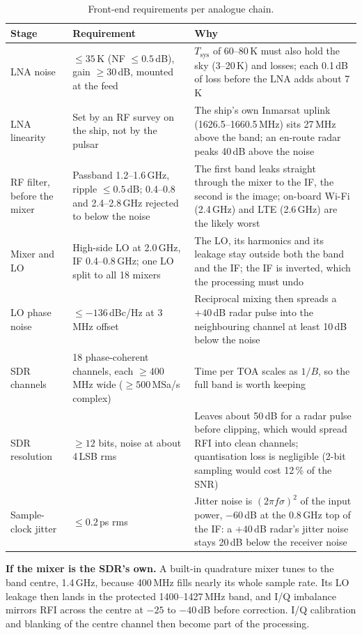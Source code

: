 \documentclass[11pt,a4paper]{article}
\begin{document}
\begin{table}[ht]
\centering
\small
\renewcommand{\arraystretch}{1.15}
\begin{tabularx}{\linewidth}{@{}p{2.6cm}XX@{}}
\toprule
Stage & Requirement & Why \\
\midrule
LNA noise & $\le 35$\,K (NF $\le 0.5$\,dB), gain $\ge 30$\,dB, mounted at the feed &
  $T_\mathrm{sys}$ of 60--80\,K must also hold the sky (3--20\,K) and losses; each 0.1\,dB of loss
  before the LNA adds about 7\,K \\
LNA linearity & Set by an RF survey on the ship, not by the pulsar &
  The ship's own Inmarsat uplink (1626.5--1660.5\,MHz) sits 27\,MHz above the band; an en-route radar
  peaks 40\,dB above the noise \\
RF filter, before the mixer & Passband 1.2--1.6\,GHz, ripple $\le 0.5$\,dB; 0.4--0.8 and 2.4--2.8\,GHz
  rejected to below the noise &
  The first band leaks straight through the mixer to the IF, the second is the image; on-board Wi-Fi
  (2.4\,GHz) and LTE (2.6\,GHz) are the likely worst \\
Mixer and LO & High-side LO at 2.0\,GHz, IF 0.4--0.8\,GHz; one LO split to all 18 mixers &
  The LO, its harmonics and its leakage stay outside both the band and the IF; the IF is inverted,
  which the processing must undo \\
LO phase noise & $\le -136$\,dBc/Hz at 3\,MHz offset &
  Reciprocal mixing then spreads a $+40$\,dB radar pulse into the neighbouring channel at least 10\,dB
  below the noise \\
SDR channels & 18 phase-coherent channels, each $\ge 400$\,MHz wide ($\ge 500$\,MSa/s complex) &
  Time per TOA scales as $1/B$, so the full band is worth keeping \\
SDR resolution & $\ge 12$ bits, noise at about 4\,LSB rms &
  Leaves about 50\,dB for a radar pulse before clipping, which would spread RFI into clean channels;
  quantisation loss is negligible (2-bit sampling would cost 12\,\% of the SNR) \\
Sample-clock jitter & $\le 0.2$\,ps rms &
  Jitter noise is $(2\pi f\sigma)^2$ of the input power, $-60$\,dB at the 0.8\,GHz top of the IF: a
  $+40$\,dB radar's jitter noise stays 20\,dB below the receiver noise \\
\bottomrule
\end{tabularx}
\caption{Front-end requirements per analogue chain.}
\label{tab:frontend}
\end{table}

\textbf{If the mixer is the SDR's own.} A built-in quadrature mixer tunes to the band centre, 1.4\,GHz,
because 400\,MHz fills nearly its whole sample rate. Its LO leakage then lands in the protected
1400--1427\,MHz band, and I/Q imbalance mirrors RFI across the centre at $-25$ to $-40$\,dB before
correction. I/Q calibration and blanking of the centre channel then become part of the processing.
\end{document}
